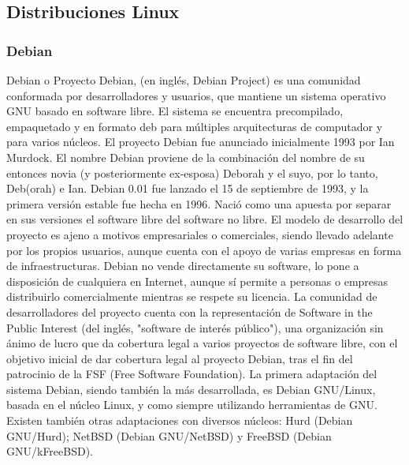 \subsection{Distribuciones Linux}

\subsubsection{Debian}
Debian o Proyecto Debian, (en inglés, Debian Project) es una comunidad conformada por desarrolladores y usuarios, que mantiene un sistema operativo GNU basado en software libre. El sistema se encuentra precompilado, empaquetado y en formato deb para múltiples arquitecturas de computador y para varios núcleos.
El proyecto Debian fue anunciado inicialmente 1993 por Ian Murdock. El nombre Debian proviene de la combinación del nombre de su entonces novia (y posteriormente ex-esposa) Deborah y el suyo, por lo tanto, Deb(orah) e Ian. Debian 0.01 fue lanzado el 15 de septiembre de 1993, y la primera versión estable fue hecha en 1996.
Nació como una apuesta por separar en sus versiones el software libre del software no libre. El modelo de desarrollo del proyecto es ajeno a motivos empresariales o comerciales, siendo llevado adelante por los propios usuarios, aunque cuenta con el apoyo de varias empresas en forma de infraestructuras. Debian no vende directamente su software, lo pone a disposición de cualquiera en Internet, aunque sí permite a personas o empresas distribuirlo comercialmente mientras se respete su licencia.
La comunidad de desarrolladores del proyecto cuenta con la representación de Software in the Public Interest (del inglés, "software de interés público"), una organización sin ánimo de lucro que da cobertura legal a varios proyectos de software libre, con el objetivo inicial de dar cobertura legal al proyecto Debian, tras el fin del patrocinio de la FSF (Free Software Foundation).
La primera adaptación del sistema Debian, siendo también la más desarrollada, es Debian GNU/Linux, basada en el núcleo Linux, y como siempre utilizando herramientas de GNU. Existen también otras adaptaciones con diversos núcleos: Hurd (Debian GNU/Hurd); NetBSD (Debian GNU/NetBSD) y FreeBSD (Debian GNU/kFreeBSD).

